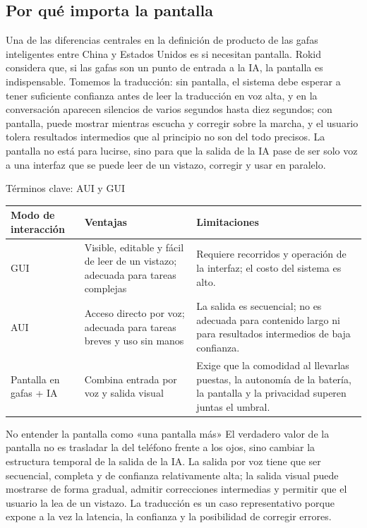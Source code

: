 \subsection{Por qué importa la pantalla}

Una de las diferencias centrales en la definición de producto de las gafas inteligentes entre China y Estados Unidos es si necesitan pantalla. Rokid considera que, si las gafas son un punto de entrada a la IA, la pantalla es indispensable. Tomemos la traducción: sin pantalla, el sistema debe esperar a tener suficiente confianza antes de leer la traducción en voz alta, y en la conversación aparecen silencios de varios segundos hasta diez segundos; con pantalla, puede mostrar mientras escucha y corregir sobre la marcha, y el usuario tolera resultados intermedios que al principio no son del todo precisos. La pantalla no está para lucirse, sino para que la salida de la IA pase de ser solo voz a una interfaz que se puede leer de un vistazo, corregir y usar en paralelo.

\begin{knowledgebox}{Términos clave: AUI y GUI}
\noindent\begin{tabularx}{\textwidth}{p{}p{}X}
\toprule
Modo de interacción & Ventajas & Limitaciones \\
\midrule
GUI & Visible, editable y fácil de leer de un vistazo; adecuada para tareas complejas & Requiere recorridos y operación de la interfaz; el costo del sistema es alto. \\
AUI & Acceso directo por voz; adecuada para tareas breves y uso sin manos & La salida es secuencial; no es adecuada para contenido largo ni para resultados intermedios de baja confianza. \\
Pantalla en gafas + IA & Combina entrada por voz y salida visual & Exige que la comodidad al llevarlas puestas, la autonomía de la batería, la pantalla y la privacidad superen juntas el umbral. \\
\bottomrule
\end{tabularx}
\end{knowledgebox}

\begin{warningbox}{No entender la pantalla como «una pantalla más»}
El verdadero valor de la pantalla no es trasladar la del teléfono frente a los ojos, sino cambiar la estructura temporal de la salida de la IA. La salida por voz tiene que ser secuencial, completa y de confianza relativamente alta; la salida visual puede mostrarse de forma gradual, admitir correcciones intermedias y permitir que el usuario la lea de un vistazo. La traducción es un caso representativo porque expone a la vez la latencia, la confianza y la posibilidad de corregir errores.
\end{warningbox}


